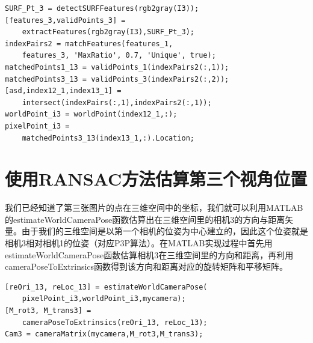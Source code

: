 \begin{lstlisting}
SURF_Pt_3 = detectSURFFeatures(rgb2gray(I3));
[features_3,validPoints_3] = 
    extractFeatures(rgb2gray(I3),SURF_Pt_3);
indexPairs2 = matchFeatures(features_1, 
    features_3, 'MaxRatio', 0.7, 'Unique', true);
matchedPoints1_13 = validPoints_1(indexPairs2(:,1));
matchedPoints3_13 = validPoints_3(indexPairs2(:,2));
[asd,index12_1,index13_1] = 
    intersect(indexPairs(:,1),indexPairs2(:,1));
worldPoint_i3 = worldPoint(index12_1,:);
pixelPoint_i3 = 
    matchedPoints3_13(index13_1,:).Location;
\end{lstlisting}


\section{使用RANSAC方法估算第三个视角位置}
我们已经知道了第三张图片的点在三维空间中的坐标，我们就可以利用MATLAB的estimateWorldCameraPose函数估算出在三维空间里的相机3的方向与距离矢量。由于我们的三维空间是以第一个相机的位姿为中心建立的，因此这个位姿就是相机3相对相机1的位姿（对应P3P算法）。在MATLAB实现过程中首先用estimateWorldCameraPose函数估算相机3在三维空间里的方向和距离，再利用cameraPoseToExtrinsics函数得到该方向和距离对应的旋转矩阵和平移矩阵。

\begin{lstlisting}
[reOri_13, reLoc_13] = estimateWorldCameraPose(
    pixelPoint_i3,worldPoint_i3,mycamera);
[M_rot3, M_trans3] = 
    cameraPoseToExtrinsics(reOri_13, reLoc_13);
Cam3 = cameraMatrix(mycamera,M_rot3,M_trans3);
\end{lstlisting}
    